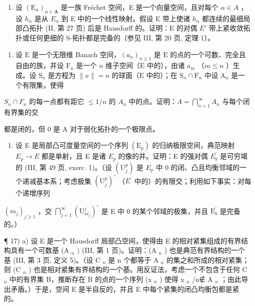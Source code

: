\begin{enumerate}
\def\labelenumi{\alph{enumi})}
\setcounter{enumi}{1}
\tightlist
\item
  设 \((\mathrm{E}_{\alpha})_{\alpha\in\mathbf{A}}\) 是一族 Fréchet 空间，E 是一个向量空间，且对每个 \(\alpha\in A\) ，设 \(h_{\alpha}\) 是从 \(E_{\alpha}\) 到 E 中的一个线性映射。假设 E 带上使诸 \(h_{\alpha}\) 都连续的最细局部凸拓扑 (II, 第 27 页) 后是 Hausdorff 的。证明：E 的对偶 \(E'\) 带上紧收敛拓扑或任何更细的 S-拓扑都是完备的（参见 III, 第 20 页, 定理 1）。
\end{enumerate}

\begin{enumerate}
\def\labelenumi{\arabic{enumi})}
\setcounter{enumi}{14}
\tightlist
\item
  设 \(\mathrm{E}\) 是一个无限维 Banach 空间，\((a_{n})_{n\geqslant 1}\) 是 \(\mathrm{E}\) 的点的一个可数、完全且自由的族，并设 \(\mathrm{F}_n\) 是一个 \(n\) 维子空间（\(\mathrm{E}\) 中的），由诸 \(a_{m}\) （\(m\leqslant n\) ）生成。设 \(\mathrm{S}_n\) 是方程为 \(\| x\| = n\) 的球面（\(\mathrm{E}\) 中的）；在 \(\mathrm{S}_n\cap \mathrm{F}_n\) 中设 \(\mathrm{A}_n\) 是一个有限集，使得
\end{enumerate}

\(S_{n} \cap F_{n}\) 的每一点都有距它 \(\leqslant 1/n\) 的 \(A_{n}\) 中的点。证明：\(A = \bigcap_{n=1}^{\infty} A_{n}\) 与每个闭有界集的交

都是闭的，但 0 是 A 对于弱化拓扑的一个极限点。

\begin{enumerate}
\def\labelenumi{\arabic{enumi})}
\setcounter{enumi}{15}
\tightlist
\item
  设 E 是局部凸可度量空间的一个序列 \((\mathrm{E}_{p})\) 的归纳极限空间，典范映射 \(E_{p} \rightarrow E\) 都是单射，且 E 是诸 \(E_{p}\) 的像的并。证明：E 的强对偶 \(E_{b}^{\prime}\) 是可穷竭的 (III, 第 49 页, exerc. 1)。（设 \((\mathrm{U}_{j}^{p})\) 是 \(E_{p}\) 中 0 的闭、凸且均衡邻域的一个递减基本系；考虑极集 \((\mathrm{U}_{j}^{p})^{\circ}\) （\(E^{\prime}\) 中的）的有限交；利用如下事实：对每个递增序列
\end{enumerate}

\((m_{j})_{j\geqslant 1}\) ，交 \(\bigcap_{j = 1}^{\infty}(\mathrm{U}_{m_j}^j)^{\circ}\) 是 E 中 0 的某个邻域的极集，并且 \(\mathrm{E}_b^\prime\) 是完备的。）

¶ 17) a) 设 E 是一个 Hausdorff 局部凸空间，使得由 E 的相对紧集组成的有界结构具有一个可数基 (A \(_{n}\) ) (III, 第 1 页)。证明：(A \(_{n}\) ) 也是典范有界结构的一个基 (III, 第 3 页, 定义 5)。（设 C \(_{n}\) 是 n 个都等于 A \(_{n}\) 的集之和所成的相对紧集；则 (C \(_{n}\) ) 也是相对紧集有界结构的一个基。用反证法，考虑一个不包含于任何 C \(_{n}\) 中的有界集 B，推断存在 B 的点的一个序列 (x \(_{n}\) ) 使得 x \(_{n}\) /n∉ A \(_{n}\) ；由此导出矛盾。）于是，空间 E 是半自反的，并且 E 中每个紧集的闭凸均衡包都是紧的。

